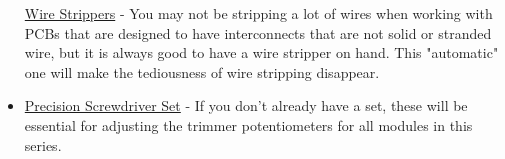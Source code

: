 \documentclass{article}
\begin{document}
\begin{itemize}
	\href{https://www.amazon.com/Kinee-Adjustable-0-2mm-3-3mm-electrical-automotive/dp/B01JO6UB7W/ref=sr_1_1_sspa?crid=1LCDVXCW48LH4&dchild=1&keywords=small+gauge+wire+stripper&qid=1602426945&sprefix=small+gauge+wire%2Caps%2C135&sr=8-1-spons&psc=1&spLa=ZW5jcnlwdGVkUXVhbGlmaWVyPUFOUkVTSzYwNkVVMVgmZW5jcnlwdGVkSWQ9QTAyOTkyNzQzTjlXMlJQNzBYSDBTJmVuY3J5cHRlZEFkSWQ9QTAxMzUwMDQxTjFSUE1aT0laSUNXJndpZGdldE5hbWU9c3BfYXRmJmFjdGlvbj1jbGlja1JlZGlyZWN0JmRvTm90TG9nQ2xpY2s9dHJ1ZQ==}{Wire Strippers} - You may not be stripping a lot of wires when working with PCBs that are designed to have interconnects that are not solid or stranded wire, but it is always good to have a wire stripper on hand. This "automatic" one will make the tediousness of wire stripping disappear.
	\item
	\href{https://www.amazon.com/Choice-9-Piece-Precision-Screwdriver-Phillips/dp/B0747DYJJR/ref=sr_1_5?crid=3J4VR5FLIPENJ&dchild=1&keywords=jewelers+screwdriver+set&qid=1602444030&sprefix=jewelers+sc%2Caps%2C141&sr=8-5}{Precision Screwdriver Set} - If you don't already have a set, these will be essential for adjusting the trimmer potentiometers for all modules in this series.
\end{itemize}
\end{document}

